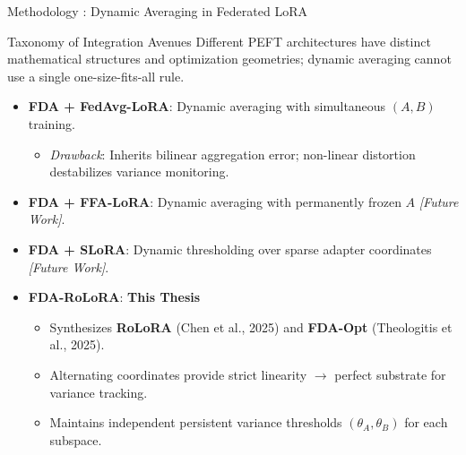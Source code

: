 \documentclass[aspectratio=169]{beamer}
\begin{document}
\begin{frame}{Methodology : Dynamic Averaging in Federated LoRA}
    \begin{block}{Taxonomy of Integration Avenues}
        Different PEFT architectures have distinct mathematical structures and optimization geometries; dynamic averaging cannot use a single one-size-fits-all rule.
    \end{block}
    
    \begin{itemize}
        \item \textbf{FDA + FedAvg-LoRA}: Dynamic averaging with simultaneous $(A, B)$ training.
        \begin{itemize}
            \item \emph{Drawback}: Inherits bilinear aggregation error; non-linear distortion destabilizes variance monitoring.
        \end{itemize}
        \item \textbf{FDA + FFA-LoRA}: Dynamic averaging with permanently frozen $A$ \emph{[Future Work]}.
        \item \textbf{FDA + SLoRA}: Dynamic thresholding over sparse adapter coordinates \emph{[Future Work]}.
        \item \textbf{FDA-RoLoRA}: \textbf{This Thesis}
        \begin{itemize}
            \item Synthesizes \textbf{RoLoRA} (Chen et al., 2025) and \textbf{FDA-Opt} (Theologitis et al., 2025).
            \item Alternating coordinates provide strict linearity $\to$ perfect substrate for variance tracking.
            \item Maintains independent persistent variance thresholds $(\theta_A, \theta_B)$ for each subspace.
        \end{itemize}
    \end{itemize}
\end{frame}
\end{document}
